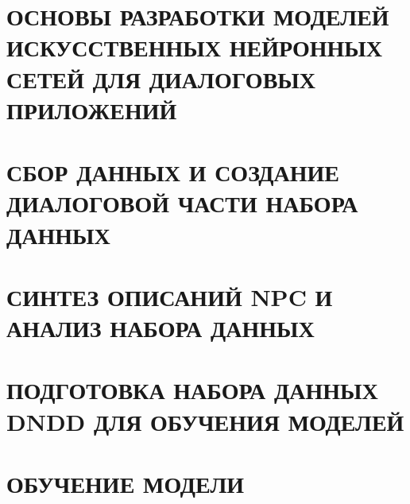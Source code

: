 \documentclass{thesis}
\begin{document}

\tableofcontents                          %
\thispagestyle{empty}


\chapter{ОСНОВЫ РАЗРАБОТКИ МОДЕЛЕЙ ИСКУССТВЕННЫХ НЕЙРОННЫХ СЕТЕЙ ДЛЯ ДИАЛОГОВЫХ ПРИЛОЖЕНИЙ}


\chapter{СБОР ДАННЫХ И СОЗДАНИЕ ДИАЛОГОВОЙ ЧАСТИ НАБОРА ДАННЫХ}


\chapter{СИНТЕЗ ОПИСАНИЙ NPC И АНАЛИЗ НАБОРА ДАННЫХ}


\chapter{ПОДГОТОВКА НАБОРА ДАННЫХ DNDD ДЛЯ ОБУЧЕНИЯ МОДЕЛЕЙ}


\chapter{ОБУЧЕНИЕ МОДЕЛИ}



\break



\appendix

\end{document}
